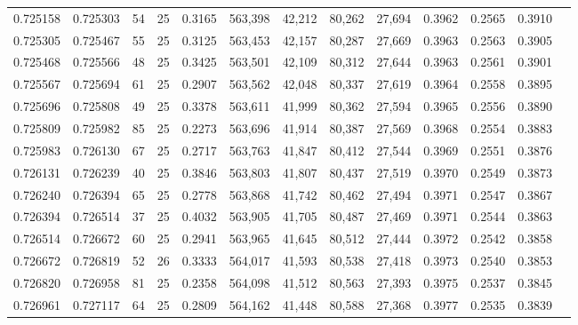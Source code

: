 \begin{tabular}{rrrrrrrrrrrrr}
0.725158 & 0.725303 &    54 &  25 &                                     0.3165 & 563,398 &  42,212 &  80,262 &  27,694 & 0.3962 & 0.2565 & 0.3910 \\
0.725305 & 0.725467 &    55 &  25 &                                     0.3125 & 563,453 &  42,157 &  80,287 &  27,669 & 0.3963 & 0.2563 & 0.3905 \\
0.725468 & 0.725566 &    48 &  25 &                                     0.3425 & 563,501 &  42,109 &  80,312 &  27,644 & 0.3963 & 0.2561 & 0.3901 \\
0.725567 & 0.725694 &    61 &  25 &                                     0.2907 & 563,562 &  42,048 &  80,337 &  27,619 & 0.3964 & 0.2558 & 0.3895 \\
0.725696 & 0.725808 &    49 &  25 &                                     0.3378 & 563,611 &  41,999 &  80,362 &  27,594 & 0.3965 & 0.2556 & 0.3890 \\
0.725809 & 0.725982 &    85 &  25 &                                     0.2273 & 563,696 &  41,914 &  80,387 &  27,569 & 0.3968 & 0.2554 & 0.3883 \\
0.725983 & 0.726130 &    67 &  25 &                                     0.2717 & 563,763 &  41,847 &  80,412 &  27,544 & 0.3969 & 0.2551 & 0.3876 \\
0.726131 & 0.726239 &    40 &  25 &                                     0.3846 & 563,803 &  41,807 &  80,437 &  27,519 & 0.3970 & 0.2549 & 0.3873 \\
0.726240 & 0.726394 &    65 &  25 &                                     0.2778 & 563,868 &  41,742 &  80,462 &  27,494 & 0.3971 & 0.2547 & 0.3867 \\
0.726394 & 0.726514 &    37 &  25 &                                     0.4032 & 563,905 &  41,705 &  80,487 &  27,469 & 0.3971 & 0.2544 & 0.3863 \\
0.726514 & 0.726672 &    60 &  25 &                                     0.2941 & 563,965 &  41,645 &  80,512 &  27,444 & 0.3972 & 0.2542 & 0.3858 \\
0.726672 & 0.726819 &    52 &  26 &                                     0.3333 & 564,017 &  41,593 &  80,538 &  27,418 & 0.3973 & 0.2540 & 0.3853 \\
0.726820 & 0.726958 &    81 &  25 &                                     0.2358 & 564,098 &  41,512 &  80,563 &  27,393 & 0.3975 & 0.2537 & 0.3845 \\
0.726961 & 0.727117 &    64 &  25 &                                     0.2809 & 564,162 &  41,448 &  80,588 &  27,368 & 0.3977 & 0.2535 & 0.3839 \\

\end{tabular}
